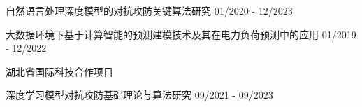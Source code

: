 
\begin{cventries}
    \vspace{-6.0mm}

    {
        \begin{cvitems}
            \item {
                \cvsubfunding
                {自然语言处理深度模型的对抗攻防关键算法研究}
                {01/2020 - 12/2023}
            }
            \item {
                \cvsubfunding
                {大数据环境下基于计算智能的预测建模技术及其在电力负荷预测中的应用}
                {01/2019 - 12/2022}
            }
        \end{cvitems}
    }

    \cvfunding
    {湖北省国际科技合作项目}
    {\begin{cvitems}
            \item {
                        \cvsubfunding
                        {深度学习模型对抗攻防基础理论与算法研究}
                        {09/2021 - 09/2023}
                  }
        \end{cvitems}
    }

\end{cventries}

\vspace{3.0mm}